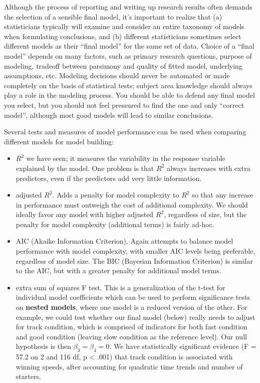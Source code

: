 \documentclass[
]{krantz}
\providecommand{\tightlist}{%
  \setlength{\itemsep}{0pt}\setlength{\parskip}{0pt}}
\begin{document}
Although the process of reporting and writing up research results often demands the selection of a sensible final model, it's important to realize that (a) statisticians typically will examine and consider an entire taxonomy of models when formulating conclusions, and (b) different statisticians sometimes select different models as their ``final model'' for the same set of data. Choice of a ``final model'' depends on many factors, such as primary research questions, purpose of modeling, tradeoff between parsimony and quality of fitted model, underlying assumptions, etc. Modeling decisions should never be automated or made completely on the basis of statistical tests; subject area knowledge should always play a role in the modeling process. You should be able to defend any final model you select, but you should not feel pressured to find the one and only ``correct model'', although most good models will lead to similar conclusions.

Several tests and measures of model performance can be used when comparing different models for model building:

\begin{itemize}
\tightlist
\item
  \(R^2\)  we have seen; it measures the variability in the response variable explained by the model. One problem is that \(R^2\) always increases with extra predictors, even if the predictors add very little information.
\item
  adjusted \(R^2\).  Adds a penalty for model complexity to \(R^2\) so that any increase in performance must outweigh the cost of additional complexity. We should ideally favor any model with higher adjusted \(R^2\), regardless of size, but the penalty for model complexity (additional terms) is fairly ad-hoc.
\item
  AIC (Akaike Information Criterion).  Again attempts to balance model performance with model complexity, with smaller AIC levels being preferable, regardless of model size. The BIC (Bayesian Information Criterion)  is similar to the AIC, but with a greater penalty for additional model terms.
\item
  extra sum of squares F test. This is a generalization of the t-test for individual model coefficients which can be used to perform significance tests on \textbf{nested models},  where one model is a reduced version of the other. For example, we could test whether our final model (below) really needs to adjust for track condition, which is comprised of indicators for both fast condition and good condition (leaving slow condition as the reference level). Our null hypothesis is then \(\beta_{3}=\beta_{4}=0\). We have statistically significant evidence (F = 57.2 on 2 and 116 df, p \textless{} .001) that track condition is associated with winning speeds, after accounting for quadratic time trends and number of starters.
\end{itemize}
\end{document}
